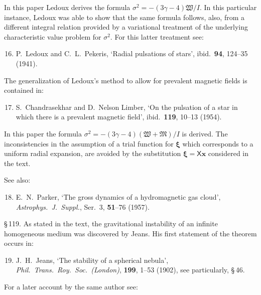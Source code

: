 In this paper Ledoux derives the formula $\sigma^2 = -(3\gamma-4)\mathfrak{W}/I$. In this particular instance, Ledoux was able to show that the same formula follows, also, from a different integral relation provided by a variational treatment of the underlying characteristic value problem for $\sigma^2$. For this latter treatment see:

\begin{enumerate}
\setcounter{enumi}{15}
\item P.\ Ledoux and C.\ L.\ Pekeris, `Radial pulsations of stars', ibid.\ \textbf{94}, 124--35 (1941).
\end{enumerate}

The generalization of Ledoux's method to allow for prevalent magnetic fields is contained in:

\begin{enumerate}
\setcounter{enumi}{16}
\item S.\ Chandrasekhar and D.\ Nelson Limber, `On the pulsation of a star in which there is a prevalent magnetic field', ibid.\ \textbf{119}, 10--13 (1954).
\end{enumerate}

In this paper the formula $\sigma^2 = -(3\gamma-4)(\mathfrak{W}+\mathfrak{M})/I$ is derived. The inconsistencies in the assumption of a trial function for $\boldsymbol{\xi}$ which corresponds to a uniform radial expansion, are avoided by the substitution $\boldsymbol{\xi} = \mathsf{X}\mathbf{x}$ considered in the text.

See also:

\begin{enumerate}
\setcounter{enumi}{17}
\item E.\ N.\ Parker, `The gross dynamics of a hydromagnetic gas cloud', \textit{Astrophys.\ J.\ Suppl.}, Ser.\ 3, \textbf{51}--76 (1957).
\end{enumerate}

\S\,119. As stated in the text, the gravitational instability of an infinite homogeneous medium was discovered by Jeans. His first statement of the theorem occurs in:

\begin{enumerate}
\setcounter{enumi}{18}
\item J.\ H.\ Jeans, `The stability of a spherical nebula', \textit{Phil.\ Trans.\ Roy.\ Soc.\ (London)}, \textbf{199}, 1--53 (1902), see particularly, \S\,46.
\end{enumerate}

For a later account by the same author see:

